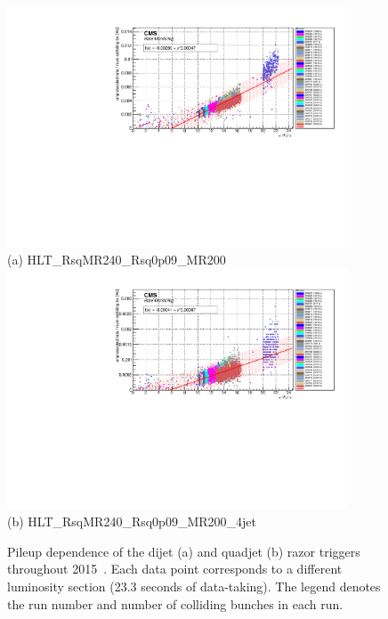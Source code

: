 \begin{figure}[ht!]
\centering 
\includegraphics[width=0.9\textwidth]{figs/hlt13TeV/linear/HLT_RsqMR240_Rsq0p09_MR200_instLumi_vs_rawRate.pdf}\\
(a) HLT\_RsqMR240\_Rsq0p09\_MR200 \\
\includegraphics[width=0.9\textwidth]{figs/hlt13TeV/linear/HLT_RsqMR240_Rsq0p09_MR200_4jet_instLumi_vs_rawRate.pdf}\\
(b) HLT\_RsqMR240\_Rsq0p09\_MR200\_4jet
\caption{\label{fig:HLTpileup1} Pileup dependence of the dijet (a) and
  quadjet (b) razor triggers throughout 2015~\cite{jmgd}. Each data point
  corresponds to a different luminosity section (23.3 seconds of data-taking). The legend denotes the
  run number and number of colliding bunches in each run.}
\end{figure}

